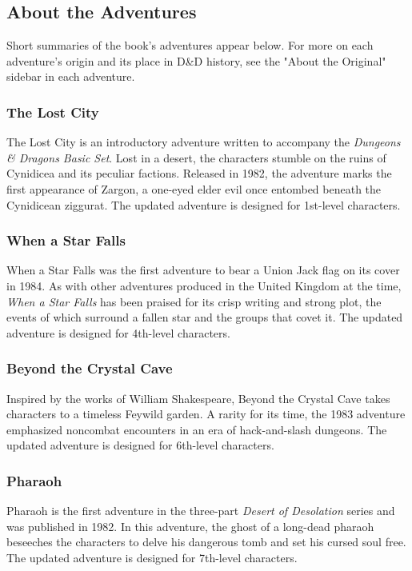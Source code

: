 \documentclass[10pt,a4paper,twoside,bg=print,twocolumn,openany,nodeprecatedcode]{dndbook}
\begin{document}
\subsection{About the Adventures}
Short summaries of the book's adventures appear below. For more on each adventure's origin and its place in D\&D history, see the "About the Original" sidebar in each adventure.

\subsubsection{The Lost City}
The Lost City is an introductory adventure written to accompany the \textit{Dungeons \& Dragons Basic Set}. Lost in a desert, the characters stumble on the ruins of Cynidicea and its peculiar factions. Released in 1982, the adventure marks the first appearance of Zargon, a one-eyed elder evil once entombed beneath the Cynidicean ziggurat. The updated adventure is designed for 1st-level characters.

\subsubsection{When a Star Falls}
When a Star Falls was the first adventure to bear a Union Jack flag on its cover in 1984. As with other adventures produced in the United Kingdom at the time, \textit{When a Star Falls} has been praised for its crisp writing and strong plot, the events of which surround a fallen star and the groups that covet it. The updated adventure is designed for 4th-level characters.

\subsubsection{Beyond the Crystal Cave}
Inspired by the works of William Shakespeare, Beyond the Crystal Cave takes characters to a timeless Feywild garden. A rarity for its time, the 1983 adventure emphasized noncombat encounters in an era of hack-and-slash dungeons. The updated adventure is designed for 6th-level characters.

\subsubsection{Pharaoh}
Pharaoh is the first adventure in the three-part \textit{Desert of Desolation} series and was published in 1982. In this adventure, the ghost of a long-dead pharaoh beseeches the characters to delve his dangerous tomb and set his cursed soul free. The updated adventure is designed for 7th-level characters.
\end{document}
